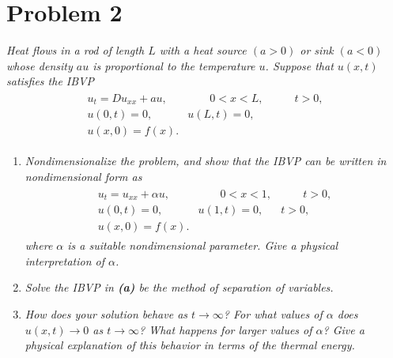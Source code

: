 \documentclass[12pt]{article}
\theoremstyle{plain}
\begin{document}
\section*{Problem 2}
\emph{Heat flows in a rod of length $L$ with a heat source $(a > 0)$ or sink $(a < 0)$ whose density $au$ is proportional to the temperature $u$.  Suppose that $u(x,t)$ satisfies the IBVP}
\begin{align*}
    \begin{array}{rrr}
        u_t = Du_{xx} + au, & \qquad 0 < x < L, & \qquad t > 0, \\
        u(0, t) = 0, & u(L, t) = 0, & \\
        u(x, 0) = f(x). & &
    \end{array}
\end{align*}
\begin{enumerate}[\bf (a)]
    \item
        \emph{Nondimensionalize the problem, and show that the IBVP can be written in nondimensional form as}
        \begin{align*}
            \begin{array}{rrr}
                u_t = u_{xx} + \alpha u, & \qquad 0 < x < 1, & \qquad t > 0, \\
                u(0, t) = 0, & u(1, t) = 0, & t > 0, \\
                u(x, 0) = f(x). & &
            \end{array}
        \end{align*}
        \emph{where $\alpha$ is a suitable nondimensional parameter.  Give a physical interpretation of $\alpha$.}
    \item
        \emph{Solve the IBVP in \textbf{(a)} be the method of separation of variables.}
    \item
        \emph{How does your solution behave as $t \rightarrow \infty$?  For what values of $\alpha$ does $u(x,t) \rightarrow 0$ as $t \rightarrow \infty$?  What happens for larger values of $\alpha$?  Give a physical explanation of this behavior in terms of the thermal energy.}
\end{enumerate}
\end{document}
